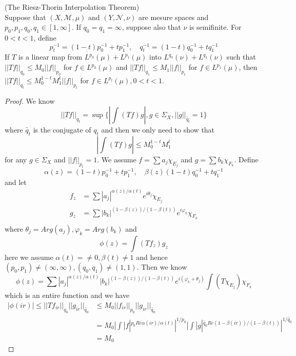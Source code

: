 \documentclass[lang=en, color=blue, ]{elegantbook}
\newcommand{\M}{\mathcal{M}}
\begin{document}
\begin{theorem}
    (The Riesz-Thorin Interpolation Theorem)\\Suppose that $(X,\M,\mu)$ and $(Y,\mathcal{N},\nu)$ are mesure spaces and $p_0,p_1,q_0,q_1 \in [1,\infty]$. If $q_0 = q_1 = \infty$, suppose also that $\nu$ is semifinite. For $0<t<1$, define
    \[
    p_t^{-1} = (1-t)p_0^{-1} + tp_1^{-1},\quad q_t^{-1} = (1-t)q_0^{-1}+tq_1^{-1}
    \]
    If $T$ is a linear map from $L^{p_0}(\mu) + L^{p_1}(\mu)$ into $L^{q_0}(\nu)+L^{q_1}(\nu)$ such that $||Tf||_{q_0} \leq M_0||f||_{p_0}$ for $f\in L^{p_0}(\mu)$ and $||Tf||_{q_1} \leq M_1||f||_{p_1}$ for $f\in L^{p_1}(\mu)$, then $||Tf||_{q_t} \leq M_0^{1-t}M_1^t ||f||_{p_t}$ for $f\in L^{p_t}(\mu), 0 < t < 1$. 
\end{theorem}
\begin{proof}\par
    We know
    \[||Tf||_{q_t} = \sup\{|\int (Tf)g|, g\in \Sigma_X, ||g||_{\tilde{q_t}} = 1\}\]
    where $\tilde{q_t}$ is the conjugate of $q_t$ and then we only need to show that
    \[
    |\int (Tf)g| \leq M_0^{1-t}M_1^t
    \]
    for any $g\in \Sigma_X$ and $||f||_{p_t} = 1$. We assume $f = \sum\limits a_j\chi_{E_j}$ and $g = \sum\limits b_k\chi_{F_k}$. Define
    \[
    \alpha(z) = (1-t)p_0^{-1} + t p_1^{-1},\quad \beta(z) (1-t)q_0^{-1} + t q_1^{-1}
    \]
    and let
    \[
    \begin{aligned}
        f_z &= \sum |a_j|^{\alpha(z)/\alpha(t)}e^{i\theta_j}\chi_{E_j} \\
        g_z &= \sum |b_k|^{(1-\beta(z))/(1-\beta(t))}e^{i\varphi_k}\chi_{F_k} \\
    \end{aligned}
    \]
    where $\theta_j = Arg(a_j), \varphi_k = Arg(b_k)$ and
    \[
    \phi(z) = \int (Tf_z)g_z
    \]
    here we assume $\alpha(t)=\neq 0, \beta(t)\neq 1$ and hence $(p_0,p_1) \neq (\infty,\infty), (q_0,q_1)\neq (1,1)$. Then we know
    \[
    \phi(z) = \sum\limits |a_j|^{\alpha(z)/\alpha(t)}|b_k|^{(1-\beta(z))/(1-\beta(t))}e^{i(\varphi_k+\theta_j)}\int(T\chi_{E_j})\chi_{F_k}
    \]
    which is an entire function and we have
    \[
    \begin{aligned}
        |\phi(ir)| \leq ||Tf_{ir}||_{q_0}||g_{ir}||_{\tilde{q_0}} &\leq M_0 ||f_{ir}||_{p_0} ||g_{ir}||_{\tilde{q_0}} \\ &= M_0 |\int |f|^{p_0Re\alpha(ir)/\alpha(t)}|^{1/p_0}|\int |g|^{\tilde{q_0}Re(1-\beta(ir))/(1-\beta(t))}|^{1/\tilde{q_0}} \\
        &= M_0
    \end{aligned}
\]
\end{proof}
\end{document}
